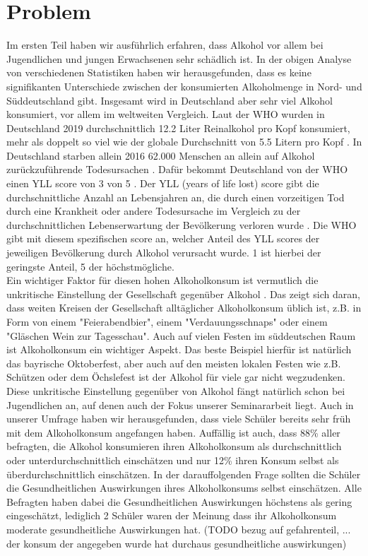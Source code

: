 \documentclass[12pt]{article}
\begin{document}
\section{Problem}
Im ersten Teil haben wir ausführlich erfahren, dass Alkohol vor allem bei Jugendlichen und jungen Erwachsenen sehr schädlich ist. 
In der obigen Analyse von verschiedenen Statistiken haben wir herausgefunden, dass es keine signifikanten Unterschiede zwischen der konsumierten Alkoholmenge in Nord- und Süddeutschland gibt. Insgesamt wird in Deutschland aber sehr viel Alkohol konsumiert, vor allem im weltweiten Vergleich. Laut der WHO wurden in Deutschland 2019 durchschnittlich 12.2 Liter Reinalkohol pro Kopf konsumiert, mehr als doppelt so viel wie der globale Durchschnitt von 5.5 Litern pro Kopf \autocite{noauthor_alcohol_nodate-1}. In Deutschland starben allein 2016 62.000 Menschen an allein auf Alkohol zurückzuführende Todesursachen \autocite{noauthor_alkoholkonsum_nodate}. Dafür bekommt Deutschland von der WHO einen YLL score von 3 von 5 \autocite{noauthor_alcohol-attributable_nodate }. Der YLL (years of life lost) score gibt die durchschnittliche Anzahl an Lebensjahren an, die durch einen vorzeitigen Tod durch eine Krankheit oder andere Todesursache im Vergleich zu der durchschnittlichen Lebenserwartung der Bevölkerung verloren wurde \autocite{martinez_reflection_2019}. Die WHO gibt mit diesem spezifischen score an, welcher Anteil des YLL scores der jeweiligen Bevölkerung durch Alkohol verursacht wurde. 1 ist hierbei der geringste Anteil, 5 der höchstmögliche.\\
Ein wichtiger Faktor für diesen hohen Alkoholkonsum ist vermutlich die unkritische Einstellung der Gesellschaft gegenüber Alkohol \autocite{noauthor_alkoholkonsum_nodate}. Das zeigt sich daran, dass weiten Kreisen der Gesellschaft alltäglicher Alkoholkonsum üblich ist, z.B. in Form von einem "Feierabendbier", einem "Verdauungsschnaps" oder einem "Gläschen Wein zur Tagesschau". Auch auf vielen Festen im süddeutschen Raum ist Alkoholkonsum ein wichtiger Aspekt. Das beste Beispiel hierfür ist natürlich das bayrische Oktoberfest, aber auch auf den meisten lokalen Festen wie z.B. Schützen oder dem Öchslefest ist der Alkohol für viele gar nicht wegzudenken. Diese unkritische Einstellung gegenüber von Alkohol fängt natürlich schon bei Jugendlichen an, auf denen auch der Fokus unserer Seminararbeit liegt. Auch in unserer Umfrage haben wir herausgefunden, dass viele Schüler bereits sehr früh mit dem Alkoholkonsum angefangen haben. Auffällig ist auch, dass 88\% aller befragten, die Alkohol konsumieren ihren Alkoholkonsum als durchschnittlich oder unterdurchschnittlich einschätzen und nur 12\% ihren Konsum selbst als überdurchschnittlich einschätzen. In der darauffolgenden Frage sollten die Schüler die Gesundheitlichen Auswirkungen ihres Alkoholkonsums selbst einschätzen. Alle Befragten haben dabei die Gesundheitlichen Auswirkungen höchstens als gering eingeschätzt, lediglich 2 Schüler waren der Meinung dass ihr Alkoholkonsum moderate gesundheitliche Auswirkungen hat. (TODO bezug auf gefahrenteil, ... der konsum der angegeben wurde hat durchaus gesundheitliche auswirkungen)\\
\end{document}

